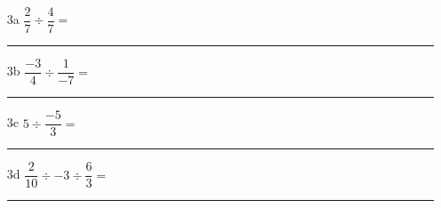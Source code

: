 \documentclass[12pt]{article}
\begin{document}
\begin{enumerate}
\item[3a] $ \dfrac{2}{7} \div \dfrac{4}{7} = $\\
  \rule{\linewidth}{0.5pt}
\item[3b] $ \dfrac{-3}{4} \div \dfrac{1}{-7} = $\\
  \rule{\linewidth}{0.5pt}
\item[3c] $ 5 \div \dfrac{-5}{3} = $\\
    \rule{\linewidth}{0.5pt}
\item[3d] $ \dfrac{2}{10} \div -3 \div \dfrac{6}{3} = $\\
  \rule{\linewidth}{0.5pt}
\end{enumerate}
\end{document}
